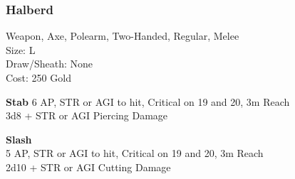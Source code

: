 \subsubsection{Halberd}\label{weapon:halberd}
Weapon, Axe, Polearm, Two-Handed, Regular, Melee\\
Size: L\\
Draw/Sheath: None\\
Cost: 250 Gold

\textbf{Stab}
6 AP, STR or AGI to hit, Critical on 19 and 20, 3m Reach\\
3d8 + \texttimes STR or AGI Piercing Damage

\textbf{Slash}\\
5 AP, STR or AGI to hit, Critical on 19 and 20, 3m Reach\\
2d10 + \texttimes STR or AGI Cutting Damage

